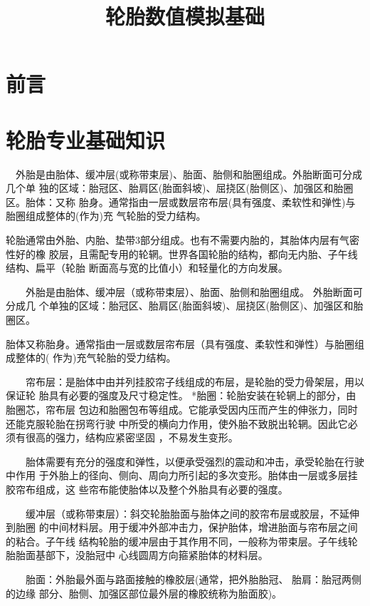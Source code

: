 \documentclass{book}
\begin{document}
\title{轮胎数值模拟基础}
\maketitle

\chapter{前言}
\chapter{轮胎专业基础知识}

　外胎是由胎体、缓冲层(或称带束层)、胎面、胎侧和胎圈组成。外胎断面可分成几个单
独的区域：胎冠区、胎肩区(胎面斜坡)、屈挠区(胎侧区)、加强区和胎圈区。胎体：又称
胎身。通常指由一层或数层帘布层(具有强度、柔软性和弹性)与胎圈组成整体的(作为)充
气轮胎的受力结构。

轮胎通常由外胎、内胎、垫带3部分组成。也有不需要内胎的，其胎体内层有气密性好的橡
胶层，且需配专用的轮辋。世界各国轮胎的结构，都向无内胎、子午线结构、扁平（轮胎
断面高与宽的比值小）和轻量化的方向发展。

　　外胎是由胎体、缓冲层（或称带束层）、胎面、胎侧和胎圈组成。 外胎断面可分成几
个单独的区域：胎冠区、胎肩区(胎面斜坡)、屈挠区(胎侧区)、加强区和胎圈区。

胎体又称胎身。通常指由一层或数层帘布层（具有强度、柔软性和弹性）与胎圈组成整体的(
作为)充气轮胎的受力结构。

　　帘布层：是胎体中由并列挂胶帘子线组成的布层，是轮胎的受力骨架层，用以保证轮
胎具有必要的强度及尺寸稳定性。 *胎圈：轮胎安装在轮辋上的部分，由胎圈芯，帘布层
包边和胎圈包布等组成。它能承受因内压而产生的伸张力，同时还能克服轮胎在拐弯行驶
中所受的横向力作用，使外胎不致脱出轮辋。因此它必须有很高的强力，结构应紧密坚固
，不易发生变形。

　　胎体需要有充分的强度和弹性，以便承受强烈的震动和冲击，承受轮胎在行驶中作用
于外胎上的径向、侧向、周向力所引起的多次变形。胎体由一层或多层挂胶帘布组成，这
些帘布能使胎体以及整个外胎具有必要的强度。

　　缓冲层（或称带束层）：斜交轮胎胎面与胎体之间的胶帘布层或胶层，不延伸到胎圈
的中间材料层。用于缓冲外部冲击力，保护胎体，增进胎面与帘布层之间的粘合。子午线
结构轮胎的缓冲层由于其作用不同，一般称为带束层。子午线轮胎胎面基部下，没胎冠中
心线圆周方向箍紧胎体的材料层。

　　胎面：外胎最外面与路面接触的橡胶层(通常，把外胎胎冠、 胎肩：胎冠两侧的边缘
部分、胎侧、加强区部位最外层的橡胶统称为胎面胶)。
\end{document}
